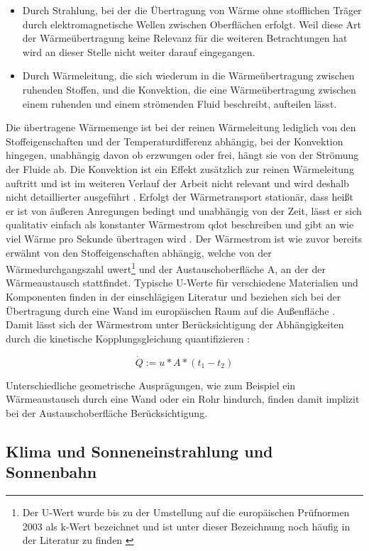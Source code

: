\begin{itemize}
	\item Durch Strahlung, bei der die Übertragung von Wärme ohne stofflichen Träger durch elektromagnetische Wellen zwischen Oberflächen erfolgt. Weil diese Art der Wärmeübertragung keine Relevanz für die weiteren Betrachtungen hat wird an dieser Stelle nicht weiter darauf eingegangen. 
	\item  Durch Wärmeleitung, die sich wiederum in die Wärmeübertragung zwischen ruhenden Stoffen, und die Konvektion, die eine Wärmeübertragung zwischen einem ruhenden und einem strömenden Fluid beschreibt, aufteilen lässt. 
\end{itemize}

Die übertragene Wärmemenge ist bei der reinen Wärmeleitung lediglich von den Stoffeigenschaften und der Temperaturdifferenz abhängig, bei der Konvektion hingegen, unabhängig davon ob erzwungen oder frei, hängt sie von der Strömung der Fluide ab. Die Konvektion ist ein Effekt zusätzlich zur reinen Wärmeleitung auftritt und ist im weiteren Verlauf der Arbeit nicht relevant und wird deshalb nicht detaillierter ausgeführt \cite[S.~3f.]{bo14}.
Erfolgt der Wärmetransport stationär, dass heißt er ist von äußeren Anregungen bedingt und unabhängig von der Zeit, lässt er sich qualitativ einfach als konstanter Wärmestrom \gls{qdot} beschreiben und gibt an wie viel Wärme pro Sekunde übertragen wird \cite[S.~5ff.]{bo14}. Der Wärmestrom ist wie zuvor bereits erwähnt von den Stoffeigenschaften abhängig, welche von der Wärmedurchgangszahl \gls{uwert}\footnote{Der U-Wert wurde bis zu der Umstellung auf die europäischen Prüfnormen 2003 als k-Wert bezeichnet und ist unter dieser Bezeichnung noch häufig in der Literatur zu finden \cite[S.1~f.]{sa04}} und der Austauschoberfläche \gls{A}, an der der Wärmeaustausch stattfindet. Typische U-Werte für verschiedene Materialien und Komponenten finden in der einschlägigen Literatur und beziehen sich bei der Übertragung durch eine Wand im europäischen Raum auf die Außenfläche \cite[S.~28]{bo14}. Damit lässt sich der Wärmestrom unter Berücksichtigung der Abhängigkeiten durch die kinetische Kopplungsgleichung quantifizieren \cite[S.~6f.]{bo14}:

\begin{equation}
\label{eq:qdot}
\dot{Q} := u*A*(t_{1}-t_{2})
\end{equation}

Unterschiedliche geometrische Ausprägungen, wie zum Beispiel ein Wärmeaustausch durch eine Wand oder ein Rohr hindurch, finden damit implizit bei der Austauschoberfläche Berücksichtigung.

\subsection{Klima und Sonneneinstrahlung und Sonnenbahn}



